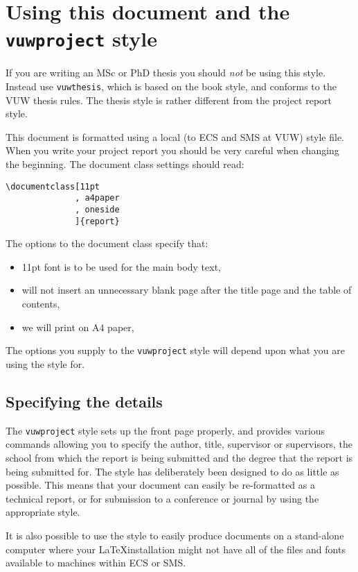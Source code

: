 \chapter{Using this document and the \texttt{vuwproject} style}\label{C:us}

If you are writing an MSc or PhD thesis you should \emph{not} be using this style. Instead use \verb=vuwthesis=, which is based on the book style, and conforms to the VUW thesis rules. The thesis style is rather different from the project report style. 

This document is formatted using a local (to ECS and SMS at VUW) style file. When you write your project report you should be very careful when changing the beginning. The document class settings should read:

\begin{verbatim}
\documentclass[11pt
              , a4paper
              , oneside
              ]{report}
\end{verbatim}
The options to the document class specify that:
\begin{itemize}
\item 11pt font is to be used for the main body text,
\item will not insert an unnecessary blank page after the title page and the table of contents,
\item we will print on A4 paper, 
\end{itemize}

The options you supply to the  \texttt{vuwproject} style will depend upon what you are using the style for.

\section{Specifying the details}
The \texttt{vuwproject} style sets up the front page properly, and provides various commands allowing you to specify the author, title, supervisor or supervisors, the school from which the report is being submitted and the degree that the report is being submitted for. The style has deliberately been designed to do as little as possible. This means that your document can easily be re-formatted as a technical report, or for submission to a conference or journal by using the appropriate style.

It is also possible to use the style to easily produce documents on a
stand-alone computer where your \LaTeX installation might not have all
of the  files and fonts available to machines within ECS or SMS.

